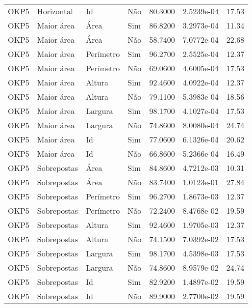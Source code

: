 \begin{tabular}{llllrrr}
OKP5      & Horizontal  & Id        & Não         & 80.3000      & 2.5239e-04 & 17.53    \\
OKP5      & Maior área  & Área      & Sim         & 86.8200      & 3.2973e-04 & 11.34    \\
OKP5      & Maior área  & Área      & Não         & 58.7400      & 7.0772e-04 & 22.68    \\
OKP5      & Maior área  & Perímetro & Sim         & 96.2700      & 2.5525e-04 & 12.37    \\
OKP5      & Maior área  & Perímetro & Não         & 69.0600      & 4.6005e-04 & 17.53    \\
OKP5      & Maior área  & Altura    & Sim         & 92.4600      & 4.0922e-04 & 12.37    \\
OKP5      & Maior área  & Altura    & Não         & 79.1100      & 5.3983e-04 & 18.56    \\
OKP5      & Maior área  & Largura   & Sim         & 98.1700      & 4.1027e-04 & 17.53    \\
OKP5      & Maior área  & Largura   & Não         & 74.8600      & 8.0080e-04 & 24.74    \\
OKP5      & Maior área  & Id        & Sim         & 77.0600      & 6.1326e-04 & 20.62    \\
OKP5      & Maior área  & Id        & Não         & 66.8600      & 5.2366e-04 & 16.49    \\
OKP5      & Sobrepostas & Área      & Sim         & 84.8600      & 4.7212e-03 & 10.31    \\
OKP5      & Sobrepostas & Área      & Não         & 83.7400      & 1.0123e-01 & 27.84    \\
OKP5      & Sobrepostas & Perímetro & Sim         & 96.2700      & 1.8673e-03 & 12.37    \\
OKP5      & Sobrepostas & Perímetro & Não         & 72.2400      & 8.4768e-02 & 19.59    \\
OKP5      & Sobrepostas & Altura    & Sim         & 92.4600      & 1.9705e-03 & 12.37    \\
OKP5      & Sobrepostas & Altura    & Não         & 74.1500      & 7.0392e-02 & 17.53    \\
OKP5      & Sobrepostas & Largura   & Sim         & 98.1700      & 4.5398e-03 & 17.53    \\
OKP5      & Sobrepostas & Largura   & Não         & 74.8600      & 8.9579e-02 & 24.74    \\
OKP5      & Sobrepostas & Id        & Sim         & 82.9200      & 1.4897e-02 & 19.59    \\
OKP5      & Sobrepostas & Id        & Não         & 89.9000      & 2.7700e-02 & 19.59    \\
\hline
\end{tabular}